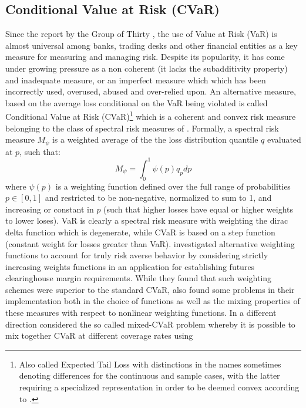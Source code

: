 \subsection{Conditional Value at Risk (CVaR)}\label{cvar}
Since the report by the Group of Thirty \citet{G301993}, the use of
Value  at Risk (VaR) is almost universal among banks, trading desks and other
financial entities as a key measure for measuring and managing risk. Despite
its popularity, it has come under growing pressure as a non coherent (it
lacks the subadditivity property) and inadequate measure, or an imperfect
measure which which has been incorrectly used, overused, abused and
over-relied upon. An alternative measure, based on the average loss
conditional on the VaR being violated is called Conditional Value at Risk
(CVaR)\footnote{Also called Expected Tail Loss with distinctions in the names
sometimes denoting differences for the continuous and sample cases, with the
latter requiring a specialized representation in order to be deemed convex
according to \citet{Rockafellar2000}.} which is a coherent and convex
risk measure belonging to the class of spectral risk measures of
\citet{Acerbi2002}. Formally, a spectral risk measure $M_\psi$ is a
weighted average of the the loss distribution quantile $q$ evaluated at $p$,
such that:
\begin{equation}
{M_\psi }=\int_0^1 {\psi \left( p \right){q_p}dp}
\end{equation}
where $\psi\left(p\right)$ is a weighting function defined over the full
range of  probabilities $p \in \left[ {0,1} \right]$ and restricted to be
non-negative, normalized to sum to 1, and increasing or constant in $p$ (such
that higher losses have equal or higher weights to lower loses). VaR is
clearly a spectral risk measure with weighting the dirac delta function which
is degenerate, while CVaR is based on a step function (constant weight for
losses greater than VaR). \citet{Cotter2006} investigated alternative
weighting functions to account for truly risk averse behavior by considering
strictly increasing weights functions in an application for establishing
futures clearinghouse margin requirements. While they found that such
weighting schemes were superior to the standard CVaR, \citet{Dowd2008}
also found some problems in their implementation both in the choice of
functions as well as the mixing properties of these measures with respect to
nonlinear weighting functions. In a different direction
\citet{Rockafellar2006} considered the so called mixed-CVaR problem
whereby it is possible to mix together CVaR at different coverage rates using
